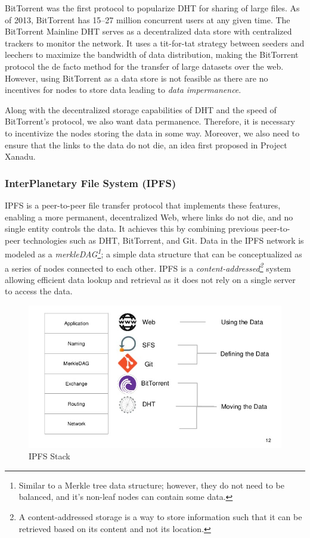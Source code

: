 		BitTorrent\cite{cohen2008bittorrent} was the first protocol to popularize DHT for sharing of large files. As of 2013, BitTorrent has 15–27 million concurrent users at any given time\cite{wang2013measuring}. The BitTorrent Mainline DHT serves as a decentralized data store with centralized trackers to monitor the network. It uses a tit-for-tat strategy between seeders and leechers to maximize the bandwidth of data distribution, making the BitTorrent protocol the de facto method for the transfer of large datasets over the web. However, using BitTorrent as a data store is not feasible as there are no incentives for nodes to store data leading to \textit{data impermanence}.
		
		Along with the decentralized storage capabilities of DHT and the speed of BitTorrent's protocol, we also want data permanence. Therefore, it is necessary to incentivize the nodes storing the data in some way. Moreover, we also need to ensure that the links to the data do not die, an idea first proposed in Project Xanadu\cite{rayward1994visions}.
		
		\subsubsection{InterPlanetary File System (IPFS)}\label{sec:ipfs}
			IPFS\cite{benet2014ipfs} is a peer-to-peer file transfer protocol that implements these features, enabling a more permanent, decentralized Web, where links do not die, and no single entity controls the data. It achieves this by combining previous peer-to-peer technologies such as DHT, BitTorrent, and Git\cite{loeliger2012version}. Data in the IPFS network is modeled as a \textit{merkleDAG\footnote{Similar to a Merkle tree data structure; however, they do not need to be balanced, and it's non-leaf nodes can contain some data.}}; a simple data structure that can be conceptualized as a series of nodes connected to each other\cite{raval2016decentralized}. IPFS is a \textit{content-addressed\footnote{A content-addressed storage is a way to store information such that it can be retrieved based on its content and not its location.}} system allowing efficient data lookup and retrieval as it does not rely on a single server to access the data.
			
			\begin{figure}[h]
				\includegraphics[width=\linewidth]{figures/ipfs-stack}
				\caption{\label{fig:ipfs-stack} IPFS Stack\protect\cite{image:ipfs:ss}}
			\end{figure}
			
